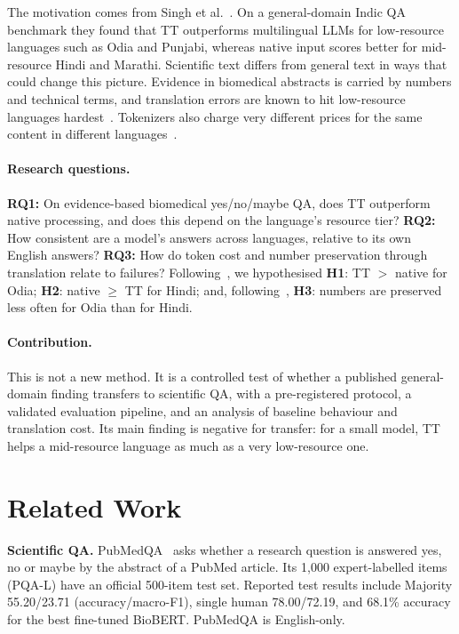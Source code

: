 \documentclass[acmsmall,nonacm]{acmart}
\begin{document}
The motivation comes from Singh et al.~\cite{singh2025indicqa}. On a general-domain Indic QA benchmark they found that TT outperforms multilingual LLMs for low-resource languages such as Odia and Punjabi, whereas native input scores better for mid-resource Hindi and Marathi. Scientific text differs from general text in ways that could change this picture. Evidence in biomedical abstracts is carried by numbers and technical terms, and translation errors are known to hit low-resource languages hardest~\cite{agrawal2024translation}. Tokenizers also charge very different prices for the same content in different languages~\cite{ahia2023tokens}.

\paragraph{Research questions.}
\textbf{RQ1:} On evidence-based biomedical yes/no/maybe QA, does TT outperform native processing, and does this depend on the language's resource tier?
\textbf{RQ2:} How consistent are a model's answers across languages, relative to its own English answers?
\textbf{RQ3:} How do token cost and number preservation through translation relate to failures?
Following~\cite{singh2025indicqa}, we hypothesised \textbf{H1}: TT $>$ native for Odia; \textbf{H2}: native $\geq$ TT for Hindi; and, following~\cite{agrawal2024translation}, \textbf{H3}: numbers are preserved less often for Odia than for Hindi.

\paragraph{Contribution.}
This is not a new method. It is a controlled test of whether a published general-domain finding transfers to scientific QA, with a pre-registered protocol, a validated evaluation pipeline, and an analysis of baseline behaviour and translation cost. Its main finding is negative for transfer: for a small model, TT helps a mid-resource language as much as a very low-resource one.

\section{Related Work}

\textbf{Scientific QA.} PubMedQA~\cite{jin2019pubmedqa} asks whether a research question is answered yes, no or maybe by the abstract of a PubMed article. Its 1,000 expert-labelled items (PQA-L) have an official 500-item test set. Reported test results include Majority 55.20/23.71 (accuracy/macro-F1), single human 78.00/72.19, and 68.1\% accuracy for the best fine-tuned BioBERT. PubMedQA is English-only.
\end{document}

